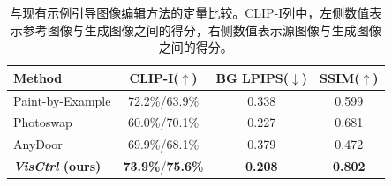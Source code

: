 
\begin{table}[t]
\centering
\caption{与现有示例引导图像编辑方法的定量比较。CLIP-I列中，左侧数值表示参考图像与生成图像之间的得分，右侧数值表示源图像与生成图像之间的得分。}\label{tab:2d_baselines}
\setlength{\tabcolsep}{6pt}    %
\renewcommand{\arraystretch}{1.1} %
\footnotesize
\begin{tabular}{lccc}
\toprule
Method & CLIP-I($\uparrow$) & BG LPIPS($\downarrow$) & SSIM($\uparrow$) \\
\midrule
Paint-by-Example \cite{yang2022paint} & 72.2\%/63.9\% & 0.338 & 0.599 \\
Photoswap \cite{gu2023photoswap}      & 60.0\%/70.1\% & 0.227 & 0.681 \\
AnyDoor \cite{chen2023anydoor}        & 69.9\%/68.1\% & 0.379 & 0.472 \\
\textbf{\textit{VisCtrl} (ours)}              & \textbf{73.9\%}/\textbf{75.6\%} & \textbf{0.208} & \textbf{0.802} \\
\bottomrule
\end{tabular}
\vspace{-2mm}
\end{table}
